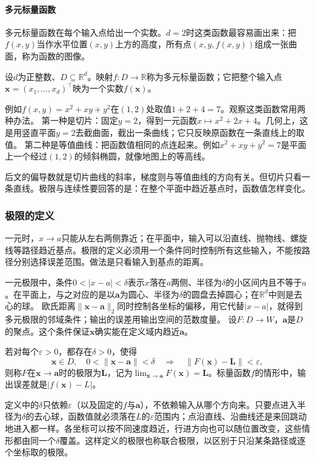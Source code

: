 \paragraph{多元标量函数}
多元标量函数在每个输入点给出一个实数。$d=2$时这类函数最容易画出来：把$f(x,y)$当作水平位置$(x,y)$上方的高度，所有点$(x,y,f(x,y))$组成一张曲面，称为函数的图像。
\begin{definition}[多元标量函数]
\label{def:multivariable-scalar-function}
设$d$为正整数、$D\subseteq\mathbb R^d$。映射$f:D\to\mathbb R$称为多元标量函数；它把整个输入点$\bm x=(x_1,\ldots,x_d)^\top$映为一个实数$f(\bm x)$。
\end{definition}
例如$f(x,y)=x^2+xy+y^2$在$(1,2)$处取值$1+2+4=7$。观察这类函数常用两种办法。
第一种是切片：固定$y=2$，得到一元函数$x\mapsto x^2+2x+4$。几何上，这是用竖直平面$y=2$去截曲面，截出一条曲线；它只反映原函数在一条直线上的取值。
第二种是等值曲线：把函数值相同的点连起来。例如$x^2+xy+y^2=7$是平面上一个经过$(1,2)$的倾斜椭圆，就像地图上的等高线。

后文的偏导数就是切片曲线的斜率，梯度则与等值曲线的方向有关。但切片只看一条直线。极限与连续性要回答的是：在整个平面中趋近基点时，函数值怎样变化。

\subsubsection{极限的定义}
\label{sec:multivariable-joint-limits}

一元时，$x\to a$只能从左右两侧靠近；在平面中，输入可以沿直线、抛物线、螺旋线等路径趋近基点。极限的定义必须用一个条件同时控制所有这些输入，不能按路径分别选择误差范围。做法是只看输入到基点的距离。

一元极限中，条件$0<|x-a|<\delta$表示$x$落在$a$两侧、半径为$\delta$的小区间内且不等于$a$。在平面上，与之对应的是以$\bm a$为圆心、半径为$\delta$的圆盘去掉圆心；在$\mathbb R^d$中则是去心的球。
欧氏距离$\lVert\bm x-\bm a\rVert_2$同时控制各坐标的偏移，用它代替$|x-a|$，就得到多元极限的邻域条件；输出的误差用输出空间的范数度量。
设$F:D\to W$，$\bm a$是$D$的聚点。这个条件保证$\bm x$确实能在定义域内趋近$\bm a$。
\begin{definition}[映射的极限]
\label{def:multivariable-limit}
若对每个$\varepsilon>0$，都存在$\delta>0$，使得
\[
 \bm x\in D,\quad 0<\lVert\bm x-\bm a\rVert<\delta
 \quad\Longrightarrow\quad \lVert F(\bm x)-\bm L\rVert<\varepsilon,
\]
则称$F$在$\bm x\to\bm a$时的极限为$\bm L$，记为$\lim_{\bm x\to\bm a}F(\bm x)=\bm L$。标量函数$f$的情形中，输出误差就是$|f(\bm x)-L|$。
\end{definition}
定义中的$\delta$只依赖$\varepsilon$（以及固定的$f$与$\bm a$），不依赖输入从哪个方向来。只要点进入半径为$\delta$的去心球，函数值就必须落在$L$的$\varepsilon$范围内；点沿直线、沿曲线还是来回跳动地进入都一样。各坐标可以按不同速度趋近，行进方向也可以随位置改变，这些情形都由同一个$\delta$覆盖。这样定义的极限也称联合极限，以区别于只沿某条路径或逐个坐标取的极限。

